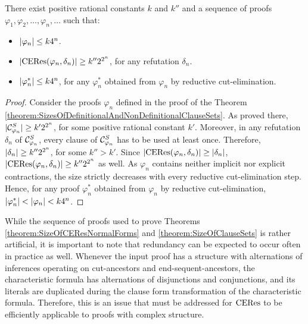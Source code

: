 \documentclass{llncs}
\begin{document}
\begin{theorem}
\label{theorem:SizeOfCEResNormalForms}
There exist positive rational constants $k$ and $k''$ and a sequence of proofs $\varphi_1, \varphi_2, \ldots, \varphi_n, \ldots$ such that:
\begin{itemize}
\item $|\varphi_n| \leq k 4^n$.
\item $|\mathrm{CERes}(\varphi_n,\delta_n)| \geq k'' 2^{2^n}$, for any refutation $\delta_n$.
\item $|\varphi_n^*| \leq k 4^n$, for any $\varphi_n^*$ obtained from $\varphi_n$ by reductive cut-elimination.
\end{itemize}
\end{theorem}
\begin{proof}
Consider the proofs $\varphi_n$ defined in the proof of the Theorem \ref{theorem:SizesOfDefinitionalAndNonDefinitionalClauseSets}. As proved there, 
$|\mathcal{C}^S_{\varphi_n}| \geq k' 2^{2^n}$, for some positive rational constant $k'$. Moreover, in any refutation $\delta_n$ of $\mathcal{C}^S_{\varphi_n}$, every clause of $\mathcal{C}^S_{\varphi_n}$ has to be used at least once. Therefore, $|\delta_n| \geq k'' 2^{2^n}$, for some $k'' > k'$. Since $|\mathrm{CERes}(\varphi_n,\delta_n)| \geq |\delta_n|$, $|\mathrm{CERes}(\varphi_n,\delta_n)| \geq k'' 2^{2^n}$ as well. As $\varphi_n$ contains neither implicit nor explicit contractions, the size strictly decreases with every reductive cut-elimination step. Hence, for any proof $\varphi_n^*$ obtained from $\varphi_n$ by reductive cut-elimination, $|\varphi_n^*| < |\varphi_n| < k 4^n$.
\hfill\QED
\end{proof}

\noindent
While the sequence of proofs used to prove Theorems \ref{theorem:SizeOfCEResNormalForms} and \ref{theorem:SizeOfClauseSets} is rather artificial, it is important to note that redundancy can be expected to occur often in practice as well. Whenever the input proof has a structure with alternations of inferences operating on cut-ancestors and end-sequent-ancestors, the characteristic formula has alternations of disjunctions and conjunctions, and its literals are duplicated during the clause form transformation of the characteristic formula. Therefore, this is an issue that must be addressed for $\mathrm{CERes}$ to be efficiently applicable to proofs with complex structure.
\end{document}

